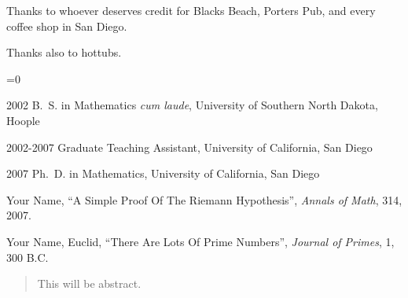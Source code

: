\begin{frontmatter}
%
\tableofcontents
\listoffigures  %
\listoftables   %



%
%
\begin{acknowledgements}
 Thanks to whoever deserves credit for Blacks Beach, Porters Pub, and
 every coffee shop in San Diego.

 Thanks also to hottubs.
\end{acknowledgements}


%
%
%
 \ifnum{}=0 %
    \begin{vitapage}
    \begin{vita}
      \item[2002] B.~S. in Mathematics \emph{cum laude}, University of Southern North Dakota, Hoople
      \item[2002-2007] Graduate Teaching Assistant, University of California, San Diego
      \item[2007] Ph.~D. in Mathematics, University of California, San Diego
    \end{vita}
    \begin{publications}
      \item Your Name, ``A Simple Proof Of The Riemann Hypothesis'', \emph{Annals of Math}, 314, 2007.
      \item Your Name, Euclid, ``There Are Lots Of Prime Numbers'', \emph{Journal of Primes}, 1, 300 B.C.
    \end{publications}
    \end{vitapage}
\fi

%
%
\begin{abstract}
  This {\doctype} will be abstract.
\end{abstract}


\end{frontmatter}

